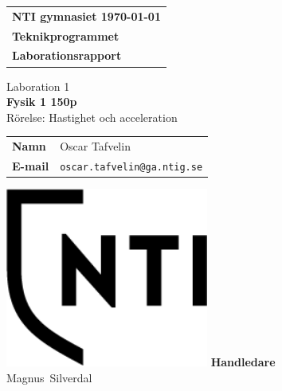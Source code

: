 \documentclass[11p, titlepage, oneside, a4paper]{article}
\makeatletter
\def\inst{Teknikprogrammet}
\def\typeofdoc{Laborationsrapport}
\def\course{Fysik 1 150p}
\def\pretitle{Laboration 1}
\def\title{Rörelse: Hastighet och acceleration}
\def\name{Oscar Tafvelin}
\def\username{oscar.tafvelin}
\def\email{\username{}@ga.ntig.se}
\def\graders{Magnus Silverdal}
\makeatother
\begin{document}
\begin{titlepage}
		\thispagestyle{empty}
		\begin{large}
			\begin{tabular}{@{}p{\textwidth}@{}}
				\textbf{NTI gymnasiet \hfill \today} \\
				\textbf{\inst} \\
				\textbf{\typeofdoc} \\
			\end{tabular}
		\end{large}
		\vspace{10mm}
		\begin{center}
			\LARGE{\pretitle} \\
			\huge{\textbf{\course}}\\
			\vspace{10mm}
			\LARGE{\title} \\
			\vspace{15mm}
			\begin{large}
				\begin{tabular}{ll}
					\textbf{Namn} & \name \\
					\textbf{E-mail} & \texttt{\email} \\
				\end{tabular}
			\end{large}
			\vfill
            \includegraphics[width=0.5\textwidth]{images/NTI Gymnasiet_Symbol_print_svart.png}
			\vfill
            \large{\textbf{Handledare}}\\
			\mbox{\large{\graders}}
		\end{center}
	\end{titlepage}

    \begin{otherlanguage}{english}
	\begin{abstract}
        We were given the task to calculate the speed and acceleration of a wagon rolling down an incline. To do this we used a real life model that we rolled down a small incline and then used a program called "Tracker" on physlets.org to calculate the distance traveled and the amount of time it took to travel that distance. The program measured the distance and time and printed out measurements for both of these.
    \end{abstract}
    \end{otherlanguage}
	\tableofcontents
	
\end{document}
